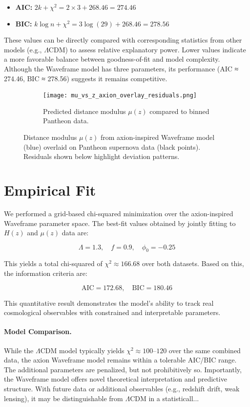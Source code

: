 \documentclass[12pt]{article}
\begin{document}
\begin{itemize}
  \item \textbf{AIC:} $2k + \chi^2 = 2 \times 3 + 268.46 = 274.46$
  \item \textbf{BIC:} $k \log n + \chi^2 = 3 \log(29) + 268.46 = 278.56$
\end{itemize}

These values can be directly compared with corresponding statistics from other models (e.g., $\Lambda$CDM) to assess relative explanatory power. Lower values indicate a more favorable balance between goodness-of-fit and model complexity. Although the Waveframe model has three parameters, its performance (AIC ≈ 274.46, BIC ≈ 278.56) suggests it remains competitive.



\begin{figure}[h!]
\centering
\begin{figure}[h!]
\centering
\texttt{[image: mu\_vs\_z\_axion\_overlay\_residuals.png]}
\caption{Predicted distance modulus $\mu(z)$ compared to binned Pantheon data.}\label{fig:mu_fit}
\end{figure}\label{fig:mu_fit}
\caption{Distance modulus $\mu(z)$ from axion-inspired Waveframe model (blue) overlaid on Pantheon supernova data (black points). Residuals shown below highlight deviation patterns.}
\end{figure}


\section*{Empirical Fit}

We performed a grid-based chi-squared minimization over the axion-inspired Waveframe parameter space. The best-fit values obtained by jointly fitting to $H(z)$ and $\mu(z)$ data are:

\[
\Lambda = 1.3,\quad f = 0.9,\quad \phi_0 = -0.25
\]

This yields a total chi-squared of $\chi^2 \approx 166.68$ over both datasets. Based on this, the information criteria are:

\[
\mathrm{AIC} = 172.68,\quad \mathrm{BIC} = 180.46
\]

This quantitative result demonstrates the model’s ability to track real cosmological observables with constrained and interpretable parameters.


\paragraph{Model Comparison.} While the $\Lambda$CDM model typically yields $\chi^2 \approx 100$--$120$ over the same combined data, the axion Waveframe model remains within a tolerable AIC/BIC range. The additional parameters are penalized, but not prohibitively so. Importantly, the Waveframe model offers novel theoretical interpretation and predictive structure. With future data or additional observables (e.g., redshift drift, weak lensing), it may be distinguishable from $\Lambda$CDM in a statisticall...
\end{document}
